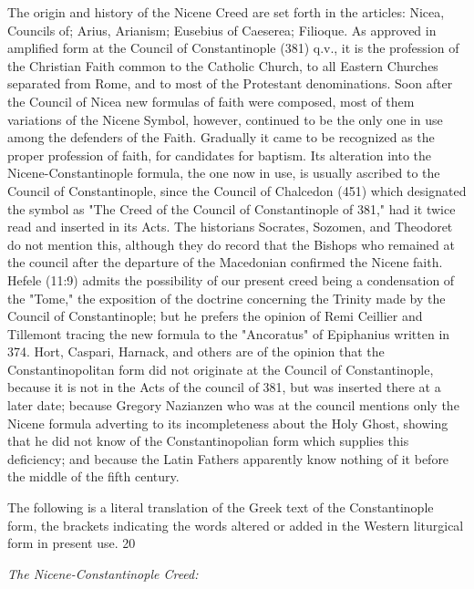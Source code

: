 The origin and history of the Nicene Creed are set forth in the articles: Nicea, Councils of;
Arius, Arianism; Eusebius of Caeserea; Filioque. As approved in amplified form at the
Council of Constantinople (381) q.v., it is the profession of the Christian Faith common to
the Catholic Church, to all Eastern Churches separated from Rome, and to most of the
Protestant denominations. Soon after the Council of Nicea new formulas of faith were
composed, most of them variations of the Nicene Symbol, however, continued to be the only
one in use among the defenders of the Faith. Gradually it came to be recognized as the proper
profession of faith, for candidates for baptism. Its alteration into the Nicene-Constantinople
formula, the one now in use, is usually ascribed to the Council of Constantinople, since the
Council of Chalcedon (451) which designated the symbol as "The Creed of the Council of
Constantinople of 381," had it twice read and inserted in its Acts. The historians Socrates,
Sozomen, and Theodoret do not mention this, although they do record that the Bishops who
remained at the council after the departure of the Macedonian confirmed the Nicene faith.
Hefele (11:9) admits the possibility of our present creed being a condensation of the "Tome,"
the exposition of the doctrine concerning the Trinity made by the Council of Constantinople;
but he prefers the opinion of Remi Ceillier and Tillemont tracing the new formula to the
"Ancoratus" of Epiphanius written in 374. Hort, Caspari, Harnack, and others are of the
opinion that the Constantinopolitan form did not originate at the Council of Constantinople,
because it is not in the Acts of the council of 381, but was inserted there at a later date;
because Gregory Nazianzen who was at the council mentions only the Nicene formula
adverting to its incompleteness about the Holy Ghost, showing that he did not know of the
Constantinopolian form which supplies this deficiency; and because the Latin Fathers
apparently know nothing of it before the middle of the fifth century.

The following is a literal translation of the Greek text of the Constantinople form, the
brackets indicating the words altered or added in the Western liturgical form in present use.
20

\textit{The Nicene-Constantinople Creed:}

